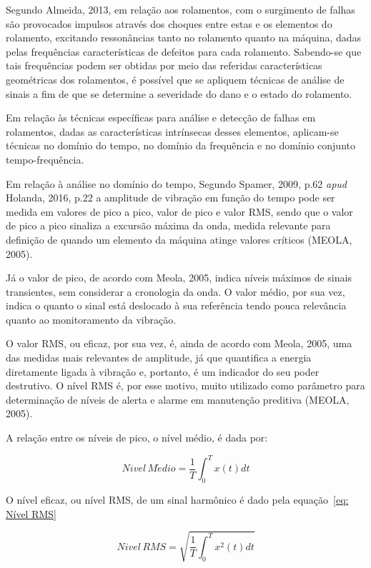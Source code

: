 \documentclass[
	12pt,				
	oneside,			
	a4paper,			
	english,			
	brazil,	
	sumario=abnt-6027-2012		
	]{abntex2ppgsi}
\begin{document}
Segundo Almeida, 2013, em relação aos rolamentos, com o surgimento de falhas são provocados impulsos através dos choques entre estas e os elementos do rolamento, excitando ressonâncias tanto no rolamento quanto na máquina, dadas pelas frequências características de defeitos para cada rolamento. Sabendo-se que tais frequências podem ser obtidas por meio das referidas características geométricas dos rolamentos, é possível que se apliquem técnicas de análise de sinais a fim de que se determine a severidade do dano e o estado do rolamento.

Em relação às técnicas específicas para análise e detecção de falhas em rolamentos, dadas as características intrínsecas desses elementos, aplicam-se técnicas no domínio do tempo, no domínio da frequência e no domínio conjunto tempo-frequência. 

Em relação à análise no domínio do tempo, Segundo Spamer, 2009, p.62 \textit{apud} Holanda, 2016, p.22 a amplitude de vibração em função do tempo pode ser medida em valores de pico a pico, valor de pico e valor RMS, sendo que o valor de pico a pico sinaliza a excursão máxima da onda, medida relevante para definição de quando um elemento da máquina atinge valores críticos (MEOLA, 2005). 

Já o valor de pico, de acordo com Meola, 2005, indica níveis máximos de sinais transientes, sem considerar a cronologia da onda. O valor médio, por sua vez, indica o quanto o sinal está deslocado à sua referência tendo pouca relevância quanto ao monitoramento da vibração. 

O valor RMS, ou eficaz, por sua vez, é, ainda de acordo com Meola, 2005, uma das medidas mais relevantes de amplitude, já que quantifica a energia diretamente ligada à vibração e, portanto, é um indicador do seu poder destrutivo. O nível RMS é, por esse motivo, muito utilizado como parâmetro para determinação de níveis de alerta e alarme em manutenção preditiva (MEOLA, 2005).

A relação entre os níveis de pico, o nível médio, é dada por:

\begin{equation}
	Nivel \, M\acute{e}dio = \frac{1}{T} \int_{0}^{T} x(t)dt
	\label{eq: Nível Médio}
\end{equation}

O nível eficaz, ou nível RMS, de um sinal harmônico é dado pela equação~\ref{eq: Nível RMS}

\begin{equation}
	Nivel \, RMS = \sqrt{ \frac{1}{T} \int_{0}^{T} x^{2}(t)dt }
	\label{eq: Nível RMS}
\end{equation}
\end{document}
